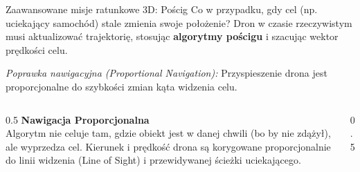 \begin{frame}{Zaawansowane misje ratunkowe 3D: Pościg}
    Co w przypadku, gdy cel (np. uciekający samochód) stale zmienia swoje położenie? Dron w czasie rzeczywistym musi aktualizować trajektorię, stosując \textbf{algorytmy pościgu} i szacując wektor prędkości celu.
    
    \vspace{0.3cm}
    \textit{Poprawka nawigacyjna (Proportional Navigation):} Przyspieszenie drona jest proporcjonalne do szybkości zmian kąta widzenia celu.
    
    \begin{columns}
        \begin{column}{0.5\textwidth}
            \small
            \textbf{Nawigacja Proporcjonalna} \\
            Algorytm nie celuje tam, gdzie obiekt jest w danej chwili (bo by nie zdążył), ale wyprzedza cel.
            Kierunek i prędkość drona są korygowane proporcjonalnie do linii widzenia (Line of Sight) i przewidywanej ścieżki uciekającego.
        \end{column}
        \begin{column}{0.5\textwidth}
            \begin{center}
            \end{center}
        \end{column}
    \end{columns}
\end{frame}
